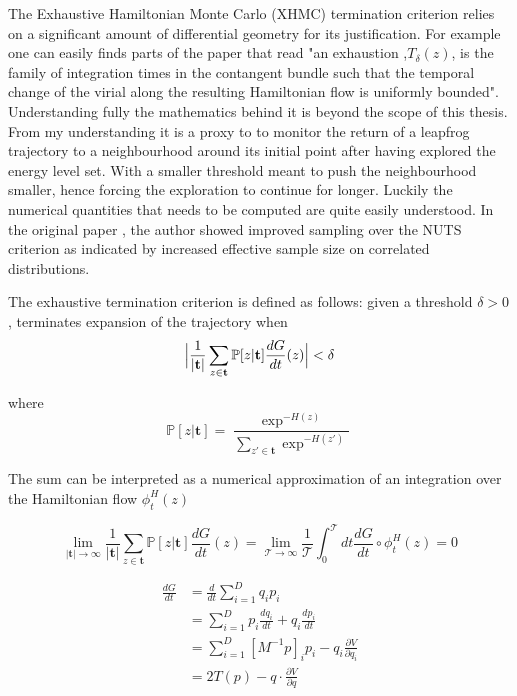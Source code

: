 \documentclass[]{report}
\begin{document}
The Exhaustive Hamiltonian Monte Carlo (XHMC) termination criterion  relies on a significant amount of differential geometry for its justification. For example one can easily finds parts of the paper that read "an exhaustion ,$T_{\delta}(z)$, is the family of integration times in the contangent bundle such that the temporal change of the virial along the resulting Hamiltonian flow is uniformly bounded". Understanding fully the mathematics behind it is beyond the scope of this thesis. From my understanding it is a proxy to to monitor the return of a leapfrog trajectory to a neighbourhood around its initial point after having explored the energy level set. With a smaller threshold meant to push the neighbourhood smaller, hence forcing the exploration to continue for longer. Luckily the numerical quantities that needs to be computed are quite easily understood. In the original paper \cite{betancourt2016identifying}, the author showed improved sampling over the NUTS criterion as indicated by increased effective sample size on correlated distributions. 

The exhaustive termination criterion is defined as follows: given a threshold $\delta > 0$, terminates expansion of the trajectory when 
\[  \Bigl |\frac{1}{|\mathbf{t}|} \sum_{z \in \mathbf{t}} \mathbb{P}[z | \mathbf{t}] \frac{dG}{dt}(z) \Bigr | < \delta \]

where 
\[ \mathbb{P}[z| \mathbf{t}] = \frac{\exp^{-H(z)}}{\sum_{z' \in \mathbf{t}} \exp^{-H(z')}} \]

The sum can be interpreted as a numerical approximation of an integration over the Hamiltonian flow $\phi_{t}^H(z)$

\[ \lim_{|\mathbf{t}| \rightarrow \infty} \frac{1}{|\mathbf{t}|} \sum_{z \in \mathbf{t}} \mathbb{P}[z | \mathbf{t}] \frac{dG}{dt}(z)  = \lim_{\mathcal{T} \rightarrow \infty} \frac{1}{\mathcal{T}} \int_0^\mathcal{T} dt \frac{dG}{dt} \circ \phi_{t}^H(z) = 0 \]

\begin{align*}
 \frac{dG}{dt} &= \frac{d}{dt}\sum_{i=1}^D q_i p_i \\
 &= \sum_{i=1}^D p_i \frac{dq_i}{dt} + q_i \frac{dp_i}{dt} \\
 &= \sum_{i=1}^D [M^{-1}p]_i p_i - q_i \frac{\partial V}{\partial q_i} \\
 &= 2 T(p) - q \cdot \frac{\partial V}{\partial q} \\
\end{align*}
\end{document}
